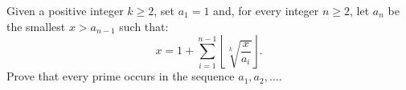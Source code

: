 Given a positive integer $k\geq2$, set $a_1=1$ and, for every integer $n\geq 2$, let $a_n$ be the smallest $x>a_{n-1}$ such that: \[x=1+\sum_{i=1}^{n-1}\left\lfloor\sqrt[k]{\frac{x}{a_i}}\right\rfloor.\] Prove that every prime occurs in the sequence $a_1,a_2,\ldots$.